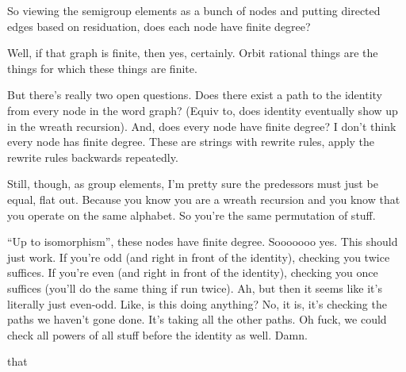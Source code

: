 \documentclass{article}
\begin{document}
So viewing the semigroup elements as a bunch of nodes and putting directed edges based on residuation, does each node have finite degree?

Well, if that graph is finite, then yes, certainly. Orbit rational things are the things for which these things are finite.

But there's really two open questions. Does there exist a path to the identity from every node in the word graph? (Equiv to, does identity eventually show up in the wreath recursion). And, does every node have finite degree? I don't think every node has finite degree. These are strings with rewrite rules, apply the rewrite rules backwards repeatedly.

Still, though, as group elements, I'm pretty sure the predessors must just be equal, flat out. Because you know you are a wreath recursion and you know that you operate on the same alphabet. So you're the same permutation of stuff.

``Up to isomorphism'', these nodes have finite degree. Sooooooo yes. This should just work. If you're odd (and right in front of the identity), checking you twice suffices. If you're even (and right in front of the identity), checking you once suffices (you'll do the same thing if run twice). Ah, but then it seems like it's literally just even-odd. Like, is this doing anything? No, it is, it's checking the paths we haven't gone done. It's taking all the other paths. Oh fuck, we could check all powers of all stuff before the identity as well. Damn.

 that 
\end{document}

